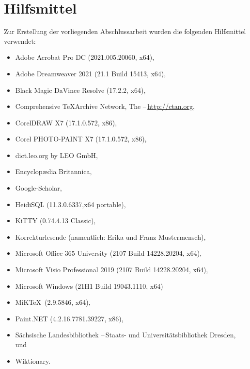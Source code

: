 \renewcommand{\bibname}{Quellenverzeichnis}


\label{Bibliography}
{}

\clearpage\section*{Hilfsmittel}
Zur Erstellung der vorliegenden Abschlussarbeit wurden die folgenden Hilfsmittel verwendet:
\begin{itemize}
	\item Adobe Acrobat Pro DC (2021.005.20060, x64),
	\item Adobe Dreamweaver 2021 (21.1 Build 15413, x64),
	\item Black Magic DaVince Resolve (17.2.2, x64),
	\item Comprehensive \TeX Archive Network, The --\,\url{http://ctan.org},
	\item CorelDRAW X7 (17.1.0.572, x86),
	\item Corel PHOTO-PAINT X7 (17.1.0.572, x86),
	\item dict.leo.org by LEO GmbH,
	\item Encyclop{\ae}dia Britannica,
	\item Google-Scholar,
	\item HeidiSQL (11.3.0.6337,x64 portable),
	\item KiTTY (0.74.4.13 Classic),
	\item Korrekturlesende (namentlich: Erika und Franz Mustermensch),
	\item Microsoft Office 365 University (2107 Build 14228.20204, x64),
	\item Microsoft Visio Professional 2019 (2107 Build 14228.20204, x64),
	\item Microsoft Windows (21H1 Build 19043.1110, x64)
	\item MiK\TeX\ (2.9.5846, x64),
	\item Paint.NET (4.2.16.7781.39227, x86),
	\item S{\"a}chsische Landesbibliothek \mbox{--\,Staats}- und Universit{\"a}tsbibliothek Dresden, und
	\item Wiktionary.
\end{itemize}

